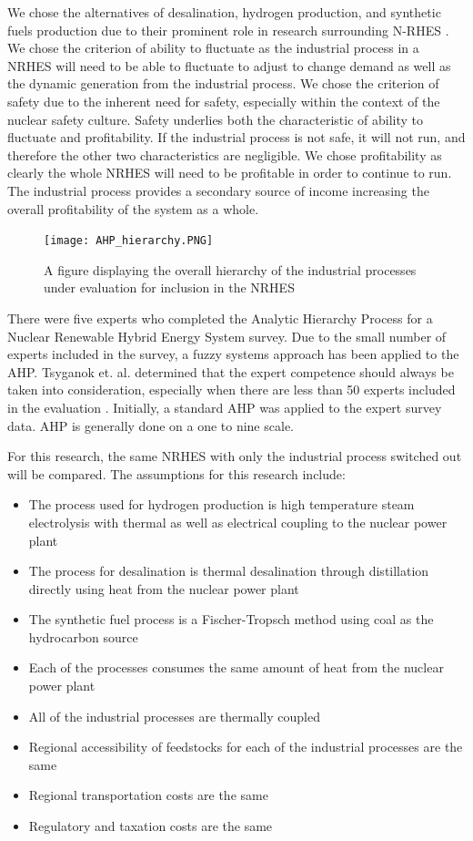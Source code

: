 \documentclass[12pt]{UIdahoMastersThesis}
\begin{document}
	We chose the alternatives of desalination, hydrogen production, and synthetic fuels production due to their prominent role in research surrounding N-RHES \cite{Bragg-Sitton2014,Locatelli2015,Kim2016,Bragg-Sitton2016,Garcia2016,Shropshire2011, Ruth2014,Bienvenu2015}.  We chose the criterion of ability to fluctuate as the industrial process in a NRHES will need to be able to fluctuate to adjust to change demand as well as the dynamic generation from the industrial process.  We chose the criterion of safety due to the inherent need for safety, especially within the context of the nuclear safety culture.  Safety underlies both the characteristic of ability to fluctuate and profitability. If the industrial process is not safe, it will not run, and therefore the other two characteristics are negligible. We chose profitability as clearly the whole NRHES will need to be profitable in order to continue to run.  The industrial process provides a secondary source of income  increasing the overall profitability of the system as a whole.


\begin{figure}[h!]
  \caption{A figure displaying the overall hierarchy of the industrial processes under evaluation for inclusion in the NRHES}
  \centering
  \texttt{[image: AHP\_hierarchy.PNG]}
\end{figure}

There were five experts who completed the Analytic Hierarchy Process for a Nuclear Renewable Hybrid Energy System survey. Due to the small number of experts included in the survey, a fuzzy systems approach has been applied to the AHP. Tsyganok et. al. determined that the expert competence should always be taken into consideration, especially when there are less than 50 experts included in the evaluation \cite{Tsyganok2012}. Initially, a standard AHP was applied to the expert survey data. AHP is generally done on a one to nine scale.



 For this research, the same NRHES with only the industrial process switched out will be compared. The assumptions for this research include:
\begin{itemize}
\item The process used for hydrogen production is high temperature steam electrolysis with thermal as well as electrical coupling to the nuclear power plant
\item  The process for desalination is thermal desalination through distillation directly using heat from the nuclear power plant
\item The synthetic fuel process is a Fischer-Tropsch method using coal as the hydrocarbon source
\item Each of the processes consumes the same amount of heat from the nuclear power plant
\item All of the industrial processes are thermally coupled
\item Regional accessibility of feedstocks for each of the industrial processes are the same
\item Regional transportation costs are the same
\item Regulatory and taxation costs are the same
\end{itemize}
\end{document}
